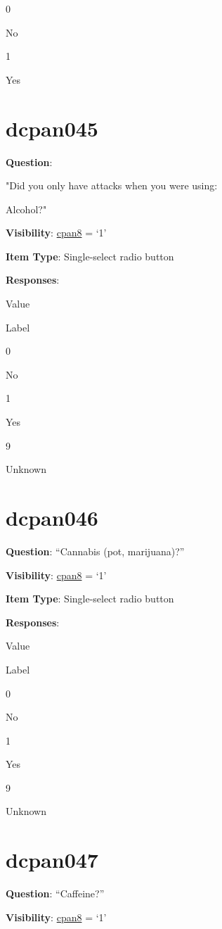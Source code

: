 \documentclass[]{book}
\begin{document}
0

No

1

Yes

\hypertarget{dcpan045}{%
\section{dcpan045}\label{dcpan045}}

\textbf{Question}:

"Did you only have attacks when you were using:

Alcohol?"

\textbf{Visibility}: \protect\hyperlink{cpan8}{cpan8} = `1'

\textbf{Item Type}: Single-select radio button

\textbf{Responses}:

Value

Label

0

No

1

Yes

9

Unknown

\hypertarget{dcpan046}{%
\section{dcpan046}\label{dcpan046}}

\textbf{Question}: ``Cannabis (pot, marijuana)?''

\textbf{Visibility}: \protect\hyperlink{cpan8}{cpan8} = `1'

\textbf{Item Type}: Single-select radio button

\textbf{Responses}:

Value

Label

0

No

1

Yes

9

Unknown

\hypertarget{dcpan047}{%
\section{dcpan047}\label{dcpan047}}

\textbf{Question}: ``Caffeine?''

\textbf{Visibility}: \protect\hyperlink{cpan8}{cpan8} = `1'
\end{document}
